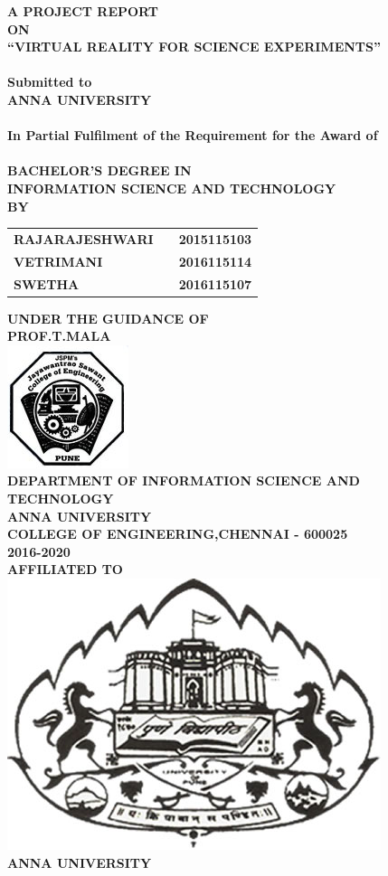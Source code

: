 \newpage
\begin{center}
\thispagestyle{empty}
\Large{\textbf{A PROJECT REPORT\\ON}}\\[0.3cm]
\Large{\textsc {\textbf{``VIRTUAL REALITY FOR SCIENCE EXPERIMENTS''}}}\\
\Large{\textbf{\\Submitted to}}
\LARGE{\textbf{\\ANNA UNIVERSITY \\}}
\large{\textbf{\\In Partial Fulfilment of the Requirement for the Award of\\}}
\LARGE{\textbf{\\BACHELOR'S DEGREE IN\\INFORMATION SCIENCE AND TECHNOLOGY}}
\vspace{0.3cm}
\Large{\textbf{\\BY}}\\[0.3cm]
\begin{table}[h]
\centering
\Large{
\begin{tabular}{>{\bfseries}lc>{\bfseries}r}
RAJARAJESHWARI & & 2015115103\\VETRIMANI & & 2016115114\\SWETHA & & 2016115107\\
\end{tabular}}
\end{table}
\large{\textbf{UNDER THE GUIDANCE OF}}\\
\large{\textbf{PROF.T.MALA}}\\[0.5cm]
\includegraphics[scale=0.5]{project/images/jscoe_logo}\\
\large{\textbf{DEPARTMENT OF INFORMATION SCIENCE AND TECHNOLOGY}}\\
\Large{\textbf{ANNA UNIVERSITY}}\\
\large{\textbf{COLLEGE OF ENGINEERING,CHENNAI - 600025}}
\large{\textbf{\\2016-2020}}\\[0.5cm]
\Large{\textbf{AFFILIATED TO}}\\[0.5cm]
\includegraphics[scale=5.0]{project/images/uop-logo}\\
\LARGE{\textbf{ANNA UNIVERSITY }}
\newpage

\end{center}